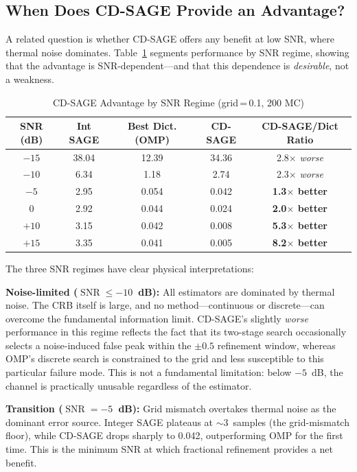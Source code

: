 \documentclass[a4paper,fleqn]{cas-dc}
\DeclareMathOperator{\SNR}{SNR}
\begin{document}
\subsection{When Does CD-SAGE Provide an Advantage?}

A related question is whether CD-SAGE offers any benefit at low SNR, where thermal noise dominates. Table~\ref{tab:snr_regime} segments performance by SNR regime, showing that the advantage is SNR-dependent---and that this dependence is \textit{desirable}, not a weakness.

\begin{table}[width=.9\linewidth,cols=5,pos=h]
\centering
\caption{CD-SAGE Advantage by SNR Regime (grid$\,$=$\,$0.1, 200 MC)}
\label{tab:snr_regime}
\small
\begin{tabular}{@{}ccccc@{}}
\toprule
SNR (dB) & Int SAGE & Best Dict. (OMP) & CD-SAGE & CD-SAGE/Dict Ratio \\
\midrule
$-15$ & 38.04 & 12.39 & 34.36 & 2.8$\times$ \textit{worse} \\
$-10$ &  6.34 &  1.18 &  2.74 & 2.3$\times$ \textit{worse} \\
$ -5$ &  2.95 &  0.054 & 0.042 & \textbf{1.3$\times$ better} \\
$  0$ &  2.92 &  0.044 & 0.024 & \textbf{2.0$\times$ better} \\
$+10$ &  3.15 &  0.042 & 0.008 & \textbf{5.3$\times$ better} \\
$+15$ &  3.35 &  0.041 & 0.005 & \textbf{8.2$\times$ better} \\
\bottomrule
\end{tabular}
\end{table}

The three SNR regimes have clear physical interpretations:

\textbf{Noise-limited ($\SNR \le -10$~dB):} All estimators are dominated by thermal noise. The CRB itself is large, and no method---continuous or discrete---can overcome the fundamental information limit. CD-SAGE's slightly \textit{worse} performance in this regime reflects the fact that its two-stage search occasionally selects a noise-induced false peak within the $\pm 0.5$ refinement window, whereas OMP's discrete search is constrained to the grid and less susceptible to this particular failure mode. This is not a fundamental limitation: below $-5$~dB, the channel is practically unusable regardless of the estimator.

\textbf{Transition ($\SNR = -5$~dB):} Grid mismatch overtakes thermal noise as the dominant error source. Integer SAGE plateaus at $\sim$3~samples (the grid-mismatch floor), while CD-SAGE drops sharply to 0.042, outperforming OMP for the first time. This is the minimum SNR at which fractional refinement provides a net benefit.
\end{document}
